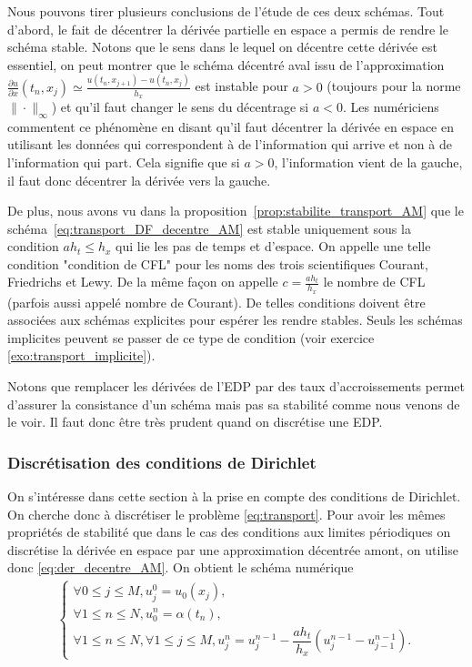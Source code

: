 \documentclass[12pt,a4paper,twoside]{article}
\begin{document}
Nous pouvons tirer plusieurs conclusions de l'\'etude de ces deux sch\'emas.
Tout d'abord, le fait de d\'ecentrer la d\'eriv\'ee partielle en espace
a permis de rendre le sch\'ema stable.
Notons que le sens dans le lequel on d\'ecentre cette d\'eriv\'ee est essentiel,
on peut montrer que le sch\'ema d\'ecentr\'e aval 
issu de l'approximation 
$\frac{\partial u}{\partial x} (t_n , x_j) \simeq \frac{u(t_n,x_{j+1}) - u(t_n,x_{j})}{h_x}$ 
est instable pour 
$a>0$ (toujours pour la norme $\| \cdot \|_{\infty}$) et qu'il faut changer le sens du d\'ecentrage si $a<0$.
Les num\'ericiens commentent ce ph\'enom\`ene en disant
qu'il faut d\'ecentrer la d\'eriv\'ee en espace en utilisant les donn\'ees qui correspondent
\`a de l'information qui arrive et non \`a de l'information qui part.
Cela signifie que si $a>0$, l'information vient de la gauche, il faut donc d\'ecentrer la d\'eriv\'ee vers la gauche.


De plus, nous avons vu dans la proposition~\ref{prop:stabilite_transport_AM} que
le sch\'ema~\eqref{eq:transport_DF_decentre_AM} est stable
uniquement sous la condition $a h_t \leq h_x$
qui lie les pas de temps et d'espace.
On appelle une telle condition "condition de CFL" pour 
les noms des trois scientifiques
Courant, Friedrichs et Lewy.
De la m\^eme fa\c{c}on on appelle $c = \frac{a h_t}{h_x}$
le nombre de CFL (parfois aussi appel\'e nombre de Courant).
De telles conditions doivent \^etre associ\'ees aux sch\'emas
explicites pour esp\'erer les rendre stables.
Seuls les sch\'emas implicites peuvent se passer de ce
type de condition (voir exercice \ref{exo:transport_implicite}).


Notons que remplacer les d\'eriv\'ees de l'EDP par des taux d'accroissements permet
d'assurer la consistance d'un sch\'ema mais pas sa stabilit\'e comme nous venons de le voir.
Il faut donc \^etre tr\`es prudent quand on discr\'etise une EDP.


\subsubsection{Discr\'etisation des conditions de Dirichlet}

On s'int\'eresse dans cette section \`a la prise en compte des conditions de Dirichlet.
On cherche donc \`a discr\'etiser le probl\`eme \eqref{eq:transport}.
Pour avoir les m\^emes propri\'et\'es de stabilit\'e que dans le cas des conditions aux limites
p\'eriodiques on discr\'etise la d\'eriv\'ee en espace par une approximation d\'ecentr\'ee
amont, on utilise donc \eqref{eq:der_decentre_AM}.
On obtient le sch\'ema num\'erique
\begin{align}
  \label{eq:transport_DF_decentre_AM_dir}
  \left\{
  \begin{array}{l}
    \forall 0 \leq j \leq M , 
    u_j^0 = u_0(x_j) ,
    \\
    \forall 1 \leq n \leq N, u_0^n = \alpha(t_n) ,
    \\
    \forall 1 \leq n \leq N, \forall 1 \leq j \leq M,
    u_j^n = u_j^{n-1} - \dfrac{a h_t}{h_x} (u_{j}^{n-1} - u_{j-1}^{n-1}) .
  \end{array}
  \right.
\end{align}
\end{document}
